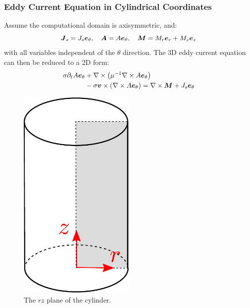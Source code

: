 \documentclass[notheorems,serif]{beamer}
\begin{document}
\begin{CJK}{UTF8}{gkai}
\begin{frame}
  \frametitle{Eddy Current Equation in Cylindrical Coordinates}
  \begin{minipage}[b]{0.56\linewidth}
    Assume the computational domain is axisymmetric, and:
    $$
    \boldsymbol{J}_s = J_s \boldsymbol{e}_{\theta}, \quad \boldsymbol{A} = A \boldsymbol{e}_{\theta}, \quad \boldsymbol{M} = M_r \boldsymbol{e}_r + M_z \boldsymbol{e}_z
    $$
    with all variables independent of the $\theta$ direction. The 3D eddy current equation can then be reduced to a 2D form:
    $$
    \begin{aligned}
    \sigma \partial_t A \boldsymbol{e}_{\theta}& + \nabla \times \left( \mu^{-1} \nabla
\times A \boldsymbol{e}_{\theta} \right) \\
    & - \sigma \boldsymbol{v} \times \left( \nabla \times A \boldsymbol{e}_{\theta}
    \right) = \nabla \times \boldsymbol{M} + J_s \boldsymbol{e}_{\theta}
    \end{aligned}
    $$
    \vspace{10pt}
  \end{minipage}
  \hfill
  \begin{minipage}[b]{0.38\linewidth}
    \centering
    \begin{figure}[htpb]
      \centering
      \includegraphics[width=0.5\textwidth]{../figures/movingmaxwell/rzplane.pdf}
      \caption{The $rz$ plane of the cylinder.}
    \end{figure}
  \end{minipage}
\end{frame}


\end{CJK}
\end{document}
